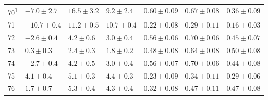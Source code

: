 \begin{tabular}{l l l l l l l}
70\textsuperscript{1} & $-7.0 \pm 2.7$ & $16.5 \pm 3.2$ & $9.2 \pm 2.4$ & $0.60 \pm 0.09$ & $0.67 \pm 0.08$ & $0.36 \pm 0.09$ \\ 
71 & $-10.7 \pm 0.4$ & $11.2 \pm 0.5$ & $10.7 \pm 0.4$ & $0.22 \pm 0.08$ & $0.29 \pm 0.11$ & $0.16 \pm 0.03$ \\ 
72 & $-2.6 \pm 0.4$ & $4.2 \pm 0.6$ & $3.0 \pm 0.4$ & $0.56 \pm 0.06$ & $0.70 \pm 0.06$ & $0.45 \pm 0.07$ \\ 
73 & $0.3 \pm 0.3$ & $2.4 \pm 0.3$ & $1.8 \pm 0.2$ & $0.48 \pm 0.08$ & $0.64 \pm 0.08$ & $0.50 \pm 0.08$ \\ 
74 & $-2.7 \pm 0.4$ & $4.2 \pm 0.5$ & $3.0 \pm 0.4$ & $0.56 \pm 0.07$ & $0.70 \pm 0.06$ & $0.44 \pm 0.08$ \\ 
75 & $4.1 \pm 0.4$ & $5.1 \pm 0.3$ & $4.4 \pm 0.3$ & $0.23 \pm 0.09$ & $0.34 \pm 0.11$ & $0.29 \pm 0.06$ \\ 
76 & $1.7 \pm 0.7$ & $5.3 \pm 0.4$ & $4.3 \pm 0.4$ & $0.32 \pm 0.08$ & $0.47 \pm 0.11$ & $0.47 \pm 0.08$ \\ 
\hline 
\end{tabular}
